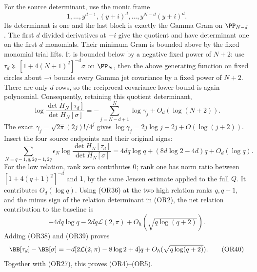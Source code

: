 For the source determinant, use the monic frame
\[
 1,\ldots,y^{d-1},(y+i)^d,\ldots,y^{N-d}(y+i)^d .
\]
Its determinant is one and the last block is exactly the Gamma
Gram on \(\PP_{N-d}\).
The first \(d\) divided derivatives at \(-i\) give the quotient
and have determinant one on the first \(d\) monomials.
Their minimum Gram is bounded above by the fixed monomial
trial lifts.  It is bounded below by a negative fixed power
of \(N+2\): use
\(\tau_d\succeq[1+4(N+1)^2]^{-d}\sigma\) on \(\PP_N\),
then the above generating function on fixed circles about
\(-i\) bounds every Gamma jet covariance by a fixed power
of \(N+2\).  There are only \(d\) rows, so the reciprocal
covariance lower bound is again polynomial.
Consequently, retaining this quotient determinant,
\[
 \log\frac{\det H_N[\tau_d]}{\det H_N[\sigma]}
 =-\sum_{j=N-d+1}^N\log\gamma_j+O_d(\log(N+2)).       \tag{OR37}
\]
The exact \(\gamma_j=\sqrt{2\pi}(2j)!/4^j\) gives
\(\log\gamma_j=2j\log j-2j+O(\log(j+2))\).
Insert the four source endpoints and their original signs:
\[
 \sum_{N=q-1,q,2q-1,2q}\epsilon_N
 \log\frac{\det H_N[\tau_d]}{\det H_N[\sigma]}
 =4dq\log q+(8d\log2-4d)q+O_d(\log q).              \tag{OR38}
\]
For the low relation, rank zero contributes \(0\); rank one
has norm ratio between \([1+4(q+1)^2]^{-d}\) and \(1\), by
the same Jensen estimate applied to the full \(Q\).
It contributes \(O_d(\log q)\).
Using (OR36) at the two high relation ranks \(q,q+1\),
and the minus sign of the relation determinant in (OR2),
the net relation contribution to the baseline is
\[
 -4dq\log q-2dq\mathcal L(2,\pi)
 +O_h(\sqrt{q\log(q+2)}).                            \tag{OR39}
\]
Adding (OR38) and (OR39) proves
\[
 \BB[\tau_d]-\BB[\sigma]
 =-d[2\mathcal L(2,\pi)-8\log2+4]q
 +O_h(\sqrt{q\log(q+2)}).                            \tag{OR40}
\]
Together with (OR27), this proves (OR4)--(OR5).

